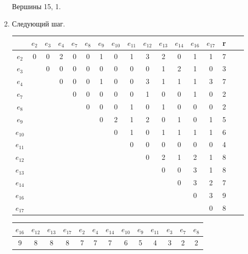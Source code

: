 \documentclass[12pt, a4paper] {ncc}
\begin{document}
\begin{enumerate}
\begin{enumerate}
Вершины 15, 1.

        \item Следующий шаг.

\begin{tabular}{|c|c|c|c|c|c|c|c|c|c|c|c|c|c|c|c|c|}
\hline
      & $e_{2}$ & $e_{3}$ & $e_{4}$ & $e_{7}$ & $e_{8}$ & $e_{9}$ & $e_{10}$ & $e_{11}$ & $e_{12}$ & $e_{13}$ & $e_{14}$ & $e_{16}$ & $e_{17}$ & r \\
\hline
$e_{2}$  &   0 & 0 & 2 &  0 & 0 & 1 & 0 & 1 & 3 & 2 & 0 & 1 & 1 & 7 \\ \hline
$e_{3}$  &     & 0 & 0 &  0 & 0 & 0 & 0 & 0 & 0 & 1 & 2 & 1 & 0 & 3 \\ \hline
$e_{4}$  &     &   & 0 &  0 & 0 & 1 & 0 & 0 & 3 & 1 & 1 & 1 & 3 & 7\\ \hline
$e_{7}$  &     &   &   &  0 & 0 & 0 & 0 & 0 & 1 & 0 & 0 & 1 & 0 & 2\\ \hline
$e_{8}$  &     &   &   &    & 0 & 0 & 0 & 1 & 0 & 1 & 0 & 0 & 0 & 2\\ \hline
$e_{9}$  &     &   &   &    &   & 0 & 2 & 1 & 2 & 0 & 1 & 0 & 1 & 5\\ \hline
$e_{10}$ &     &   &   &    &   &   & 0 & 1 & 0 & 1 & 1 & 1 & 1 & 6\\ \hline
$e_{11}$ &     &   &   &    &   &   &   & 0 & 0 & 0 & 0 & 0 & 0 & 4\\ \hline
$e_{12}$ &     &   &   &    &   &   &   &   & 0 & 2 & 1 & 2 & 1 & 8\\ \hline
$e_{13}$ &     &   &   &    &   &   &   &   &   & 0 & 0 & 3 & 1 & 8\\ \hline
$e_{14}$ &     &   &   &    &   &   &   &   &   &   & 0 & 3 & 2 & 7\\ \hline
$e_{16}$ &     &   &   &    &   &   &   &   &   &   &   & 0 & 3 & 9\\ \hline
$e_{17}$ &     &   &   &    &   &   &   &   &   &   &   &   & 0 & 8\\ \hline
\end{tabular}

\begin{center}
\begin{longtable}{|c c c c c c c c c c c c c |}
\hline
$e_{16}$ & $e_{12}$ & $e_{13}$ & $e_{17}$ & $e_{2}$ & $e_{4}$ & $e_{14}$ & $e_{10}$ & $e_{9}$ & $e_{11}$ & $e_{3}$ & $e_{7}$ & $e_{8}$ \\
\hline
9 & 8 & 8 & 8 & 7 & 7 & 7 & 6 & 5 & 4 & 3 & 2 & 2\\
\hline
\end{longtable}
\end{center}


\end{enumerate}
\end{enumerate}
\end{document}
